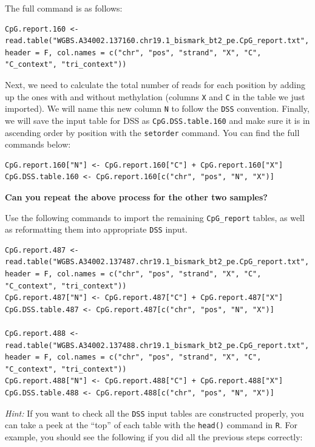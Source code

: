 \documentclass[
]{book}
\begin{document}
The full command is as follows:

\begin{verbatim}
CpG.report.160 <- read.table("WGBS.A34002.137160.chr19.1_bismark_bt2_pe.CpG_report.txt", header = F, col.names = c("chr", "pos", "strand", "X", "C", "C_context", "tri_context")) 
\end{verbatim}

Next, we need to calculate the total number of reads for each position by adding up the ones with and without methylation (columns \texttt{X} and \texttt{C} in the table we just imported). We will name this new column \texttt{N} to follow the \texttt{DSS} convention. Finally, we will save the input table for DSS as \texttt{CpG.DSS.table.160} and make sure it is in ascending order by position with the \texttt{setorder} command. You can find the full commands below:

\begin{verbatim}
CpG.report.160["N"] <- CpG.report.160["C"] + CpG.report.160["X"]
CpG.DSS.table.160 <- CpG.report.160[c("chr", "pos", "N", "X")]
\end{verbatim}

\textbf{Can you repeat the above process for the other two samples?}

Use the following commands to import the remaining \texttt{CpG\_report} tables, as well as reformatting them into appropriate \texttt{DSS} input.

\begin{verbatim}
CpG.report.487 <- read.table("WGBS.A34002.137487.chr19.1_bismark_bt2_pe.CpG_report.txt", header = F, col.names = c("chr", "pos", "strand", "X", "C", "C_context", "tri_context")) 
CpG.report.487["N"] <- CpG.report.487["C"] + CpG.report.487["X"]
CpG.DSS.table.487 <- CpG.report.487[c("chr", "pos", "N", "X")]

CpG.report.488 <- read.table("WGBS.A34002.137488.chr19.1_bismark_bt2_pe.CpG_report.txt", header = F, col.names = c("chr", "pos", "strand", "X", "C", "C_context", "tri_context")) 
CpG.report.488["N"] <- CpG.report.488["C"] + CpG.report.488["X"]
CpG.DSS.table.488 <- CpG.report.488[c("chr", "pos", "N", "X")]
\end{verbatim}

\emph{Hint:} If you want to check all the \texttt{DSS} input tables are constructed properly, you can take a peek at the ``top'' of each table with the \texttt{head()} command in \texttt{R}. For example, you should see the following if you did all the previous steps correctly:
\end{document}
